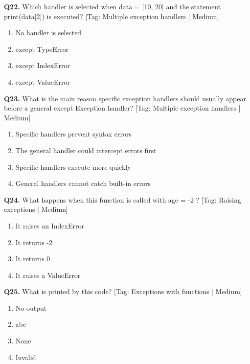 \vspace{2mm}
\noindent\textbf{Q22.} Which handler is selected when data = [10, 20] and the statement print(data[2]) is executed? \hfill [Tag: Multiple exception handlers | Medium]
\begin{enumerate}[label=(\alph*),topsep=2pt,itemsep=1pt,partopsep=0pt,parsep=0pt]
    \item {No handler is selected}
    \item {except TypeError}
    \item {except IndexError}
    \item {except ValueError}
\end{enumerate}
\vspace{2mm}
\noindent\textbf{Q23.} What is the main reason specific exception handlers should usually appear before a general except Exception handler? \hfill [Tag: Multiple exception handlers | Medium]
\begin{enumerate}[label=(\alph*),topsep=2pt,itemsep=1pt,partopsep=0pt,parsep=0pt]
    \item {Specific handlers prevent syntax errors}
    \item {The general handler could intercept errors first}
    \item {Specific handlers execute more quickly}
    \item {General handlers cannot catch built-in errors}
\end{enumerate}
\vspace{2mm}
\noindent\textbf{Q24.} What happens when this function is called with age = -2 ? \hfill [Tag: Raising exceptions | Medium]
\begin{enumerate}[label=(\alph*),topsep=2pt,itemsep=1pt,partopsep=0pt,parsep=0pt]
    \item {It raises an IndexError}
    \item {It returns -2}
    \item {It returns 0}
    \item {It raises a ValueError}
\end{enumerate}
\vspace{2mm}
\noindent\textbf{Q25.} What is printed by this code? \hfill [Tag: Exceptions with functions | Medium]
\begin{enumerate}[label=(\alph*),topsep=2pt,itemsep=1pt,partopsep=0pt,parsep=0pt]
    \item {No output}
    \item {abc}
    \item {None}
    \item {Invalid}
\end{enumerate}
